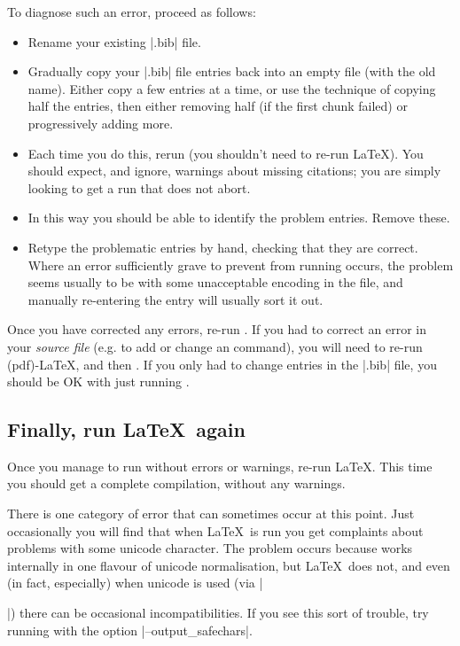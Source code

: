 To diagnose such an error, proceed as follows:
\begin{itemize}
 \item Rename your existing |.bib| file.
 \item Gradually copy your |.bib| file entries back into an empty file (with the old name). Either copy a few entries at a time, or use the technique of copying half the entries, then either removing half (if the first chunk failed) or progressively adding more.
 \item Each time you do this, rerun  (you shouldn't need to re-run \LaTeX). You should expect, and ignore, warnings about missing citations; you are simply looking to get a run that does not abort.
 \item In this way you should be able to identify the problem entries. Remove these.
 \item Retype the problematic entries by hand, checking that they are correct. Where an error sufficiently grave to prevent  from running occurs, the problem seems usually to be with some unacceptable encoding in the file, and manually re-entering the entry will usually sort it out.
\end{itemize}

Once you have corrected any errors, re-run . If you had to correct an error in your \emph{source file} (e.g. to add or change an  command), you will need to re-run (pdf)-\LaTeX, and then . If you only had to change entries in the |.bib| file, you should be OK with just running .

\subsection{Finally, run \LaTeX\ again}

Once you manage to run  without errors or warnings, re-run \LaTeX. This time you should get a complete compilation, without any warnings.

There is one category of error that can sometimes occur at this point. Just occasionally you will find that when \LaTeX\ is run you get complaints about problems with some unicode character. The problem occurs because  works internally in one flavour of unicode normalisation, but \LaTeX\ does not, and even (in fact, especially) when unicode is used (via |\usepackage[utf8]{inputenc}|) there can be occasional incompatibilities. If you see this sort of trouble, try running  with the option |--output_safechars|.

